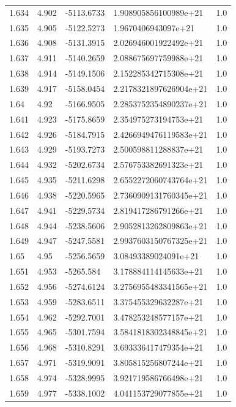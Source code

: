 \begin{tabular}{lllll}
1.634 & 4.902 & -5113.6733 & 1.908905856100989e+21 & 1.0 \\
1.635 & 4.905 & -5122.5273 & 1.9670406943097e+21 & 1.0 \\
1.636 & 4.908 & -5131.3915 & 2.026946001922492e+21 & 1.0 \\
1.637 & 4.911 & -5140.2659 & 2.088675697759988e+21 & 1.0 \\
1.638 & 4.914 & -5149.1506 & 2.152285342715308e+21 & 1.0 \\
1.639 & 4.917 & -5158.0454 & 2.2178321897626904e+21 & 1.0 \\
1.64 & 4.92 & -5166.9505 & 2.2853752354890237e+21 & 1.0 \\
1.641 & 4.923 & -5175.8659 & 2.354975273194753e+21 & 1.0 \\
1.642 & 4.926 & -5184.7915 & 2.4266949476119583e+21 & 1.0 \\
1.643 & 4.929 & -5193.7273 & 2.500598811288837e+21 & 1.0 \\
1.644 & 4.932 & -5202.6734 & 2.576753382691323e+21 & 1.0 \\
1.645 & 4.935 & -5211.6298 & 2.6552272060743764e+21 & 1.0 \\
1.646 & 4.938 & -5220.5965 & 2.7360909131760345e+21 & 1.0 \\
1.647 & 4.941 & -5229.5734 & 2.819417286791266e+21 & 1.0 \\
1.648 & 4.944 & -5238.5606 & 2.9052813262809863e+21 & 1.0 \\
1.649 & 4.947 & -5247.5581 & 2.9937603150767325e+21 & 1.0 \\
1.65 & 4.95 & -5256.5659 & 3.08493389024091e+21 & 1.0 \\
1.651 & 4.953 & -5265.584 & 3.178884114145633e+21 & 1.0 \\
1.652 & 4.956 & -5274.6124 & 3.2756955483341565e+21 & 1.0 \\
1.653 & 4.959 & -5283.6511 & 3.375455329632287e+21 & 1.0 \\
1.654 & 4.962 & -5292.7001 & 3.478253248577157e+21 & 1.0 \\
1.655 & 4.965 & -5301.7594 & 3.5841818302348845e+21 & 1.0 \\
1.656 & 4.968 & -5310.8291 & 3.693336417479354e+21 & 1.0 \\
1.657 & 4.971 & -5319.9091 & 3.805815256807244e+21 & 1.0 \\
1.658 & 4.974 & -5328.9995 & 3.921719586766498e+21 & 1.0 \\
1.659 & 4.977 & -5338.1002 & 4.041153729077855e+21 & 1.0 \\

\end{tabular}
